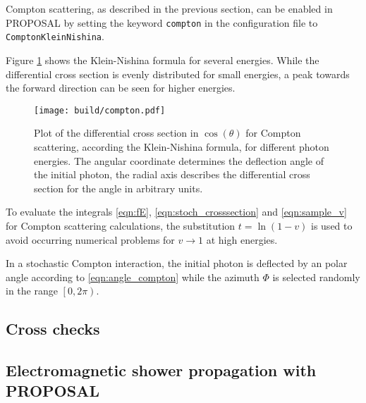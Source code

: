 \begin{sloppypar}
Compton scattering, as described in the previous section, can be enabled in PROPOSAL by setting the keyword \texttt{compton} in the configuration file to \texttt{ComptonKleinNishina}.
\end{sloppypar}
Figure \ref{fig:compton} shows the Klein-Nishina formula for several energies.
While the differential cross section is evenly distributed for small energies, a peak towards the forward direction can be seen for higher energies.

\begin{figure}
    \centering
    \texttt{[image: build/compton.pdf]}
    \caption{Plot of the differential cross section in $\cos(\theta)$ for Compton scattering, according the Klein-Nishina formula, for different photon energies. The angular coordinate determines the deflection angle of the initial photon, the radial axis describes the differential cross section for the angle in arbitrary units.}
    \label{fig:compton}
\end{figure}

To evaluate the integrals \eqref{eqn:fE}, \eqref{eqn:stoch_crosssection} and \eqref{eqn:sample_v} for Compton scattering calculations, the substitution $t = \ln(1 - v)$ is used to avoid occurring numerical problems for $v \to 1$ at high energies.

In a stochastic Compton interaction, the initial photon is deflected by an polar angle according to \eqref{eqn:angle_compton} while the azimuth $\Phi$ is selected randomly in the range $\left[0,2\pi\right)$.

\subsection{Cross checks}

\subsection{Electromagnetic shower propagation with PROPOSAL}

